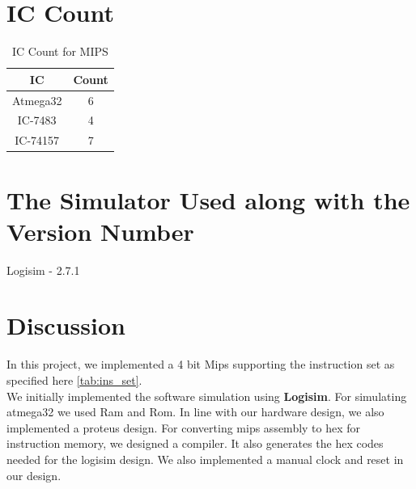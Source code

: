 \documentclass{article}
\begin{document}
\section{IC Count}

\begin{table}[!h]
    \centering
    \begin{tabular}{| c | c |}
        \hline
        \textbf{IC} & \textbf{Count}\\  \hline \hline
        Atmega32 & 6 \\ \hline
        IC-7483 & 4 \\ \hline
        IC-74157 & 7 \\ \hline
    \end{tabular}
    \caption{IC Count for MIPS}
    \label{tab:count_table}
\end{table}

\section{The Simulator Used along with the Version Number}
\large
Logisim - 2.7.1


\section{Discussion}
\large
In this project, we implemented a 4 bit Mips supporting the instruction set as specified here \ref{tab:ins_set}. \\

We initially implemented the software simulation using \textbf{Logisim}. For simulating atmega32 we used Ram and Rom. In line with our hardware design, we also implemented a proteus design. For converting mips assembly to hex for instruction memory, we designed a compiler. It also generates the hex codes needed for the logisim design. We also implemented a manual clock and reset in our design.
\end{document}
